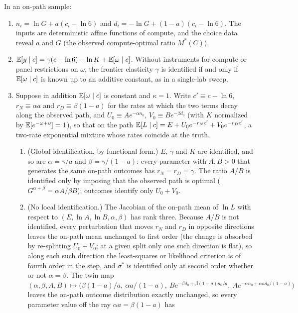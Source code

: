 \begin{proposition}\label{prop:fd}
In an on-path sample:
\begin{enumerate}
\item[(i)] $n_i=\ln G+a(c_i-\ln6)$ and $d_i=-\ln G+(1-a)(c_i-\ln6)$. The inputs are deterministic affine functions of
compute, and the choice data reveal $a$ and $G$ (the observed compute-optimal ratio $M^*(C)$).
\item[(ii)] $\mathbb{E}[y\mid c]=\gamma(c-\ln6)-\ln K+\mathbb{E}[\omega\mid c]$. Without instruments for compute or panel restrictions
on $\omega$, the frontier elasticity $\gamma$ is identified if and only if $\mathbb{E}[\omega\mid c]$ is known up to an additive
constant, as in a single-lab sweep.
\item[(iii)] Suppose in addition $\mathbb{E}[\omega\mid c]$ is constant and $\kappa=1$. Write $c'\equiv c-\ln6$, $r_N\equiv\alpha a$
and $r_D\equiv\beta(1-a)$ for the rates at which the two terms decay along the observed path, and $U_0\equiv Ae^{-\alpha n_0}$,
$V_0\equiv Be^{-\beta d_0}$ (with $K$ normalized by $\mathbb{E}[e^{-\omega+\upsilon}]=1$), so that on the path
$\mathbb{E}[L\mid c]=E+U_0e^{-r_Nc'}+V_0e^{-r_Dc'}$, a two-rate exponential mixture whose rates coincide at the truth.
\begin{enumerate}
\item[(a)] (Global identification, by functional form.) $E$, $\gamma$ and $K$ are identified, and so are $\alpha=\gamma/a$
and $\beta=\gamma/(1-a)$: every parameter with $A,B>0$ that generates the same on-path outcomes has $r_N=r_D=\gamma$. The
ratio $A/B$ is identified only by imposing that the observed path is optimal ($G^{\alpha+\beta}=\alpha A/\beta B$);
outcomes identify only $U_0+V_0$.
\item[(b)] (No local identification.) The Jacobian of the on-path mean of $\ln L$ with respect to $(E,\ln A,\ln B,\alpha,\beta)$
has rank three. Because $A/B$ is not identified, every perturbation that moves $r_N$ and $r_D$ in opposite directions
leaves the on-path mean unchanged to first order (the change is absorbed by re-splitting $U_0+V_0$; at a given split
only one such direction is flat), so along each such
direction the least-squares or likelihood criterion is of fourth order in the step, and $\sigma^*$ is identified only at
second order whether or not $\alpha=\beta$. The twin map
$(\alpha,\beta,A,B)\mapsto\big(\beta(1-a)/a,\ \alpha a/(1-a),\ Be^{-\beta d_0+\beta(1-a)n_0/a},\ Ae^{-\alpha n_0+\alpha ad_0/(1-a)}\big)$
leaves the on-path outcome distribution exactly unchanged, so every parameter value off the ray $\alpha a=\beta(1-a)$ has

\end{enumerate}
\end{enumerate}
\end{proposition}
